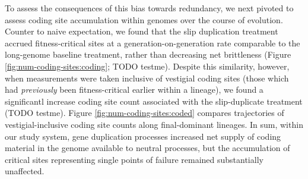 To assess the consequences of this bias towards redundancy, we next pivoted to assess coding site accumulation within genomes over the course of evolution.
Counter to naive expectation, we found that the slip duplication treatment accrued fitness-critical sites at a generation-on-generation rate comparable to the long-genome baseline treatment, rather than decreasing net brittleness (Figure \ref{fig:num-coding-sites:coding}; TODO testme).
Despite this similarity, however, when measurements were taken inclusive of vestigial coding sites (those which had \textit{previously} been fitness-critical earlier within a lineage), we found a significantl increase coding site count associated with the slip-duplicate treatment (TODO testme).
Figure \ref{fig:num-coding-sites:coded} compares trajectories of vestigial-inclusive coding site counts along final-dominant lineages.
In sum, within our study system, gene duplication processes increased net supply of coding material in the genome available to neutral processes, but the accumulation of critical sites representing single points of failure remained substantially unaffected.

